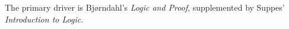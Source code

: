 \vspace{1em}

\begin{remark}
The primary driver is Bjørndahl's \textit{Logic and Proof},
supplemented by Suppes' \textit{Introduction to Logic}.
\end{remark}


